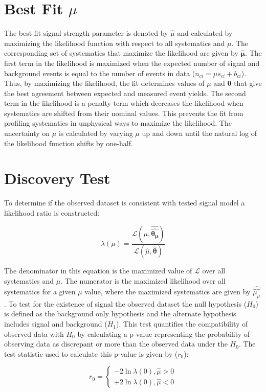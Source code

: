 \section{Best Fit $\mu$}
The best fit signal strength parameter is denoted by $\hat{\mu}$ and calculated by maximizing the likelihood function with respect to all systematics and $\mu$. The corresponding set of systematics that maximize the likelihood are given by $\bm{\hat{\mu}}$. The first term in the likelihood is maximized when the expected number of signal and background events is equal to the number of events in data ($n_{ci}=\mu s_{ci} + b_{ci}$). Thus, by maximizing the likelihood, the fit determines values of $\mu$ and $\bm{\theta}$ that give the best agreement between expected and measured event yields. The second term in the likelihood is a penalty term which decreases the likelihood when systematics are shifted from their nominal values. This prevents the fit from profiling systematics in unphysical ways to maximize the likelihood. The uncertainty on $\mu$ is calculated by varying $\mu$ up and down until the natural log of the likelihood function shifts by one-half.


\section{Discovery Test}
To determine if the observed dataset is consistent with tested signal model a likelihood ratio is constructed:

\begin{equation}
\lambda(\mu)=\frac{\mathcal{L}(\mu, \hat{\hat{\bm{\theta_{\mu}}}})}{\mathcal{L}(\hat{\mu}, \hat{\bm{\theta}})}
\end{equation}

The denominator in this equation is the maximized value of $\mathcal{L}$ over all systematics and $\mu$. The numerator is the maximized likelihood over all systematics for a given $\mu$ value, where the maximized systematics are given by $\hat{\hat{\mu_{\mu}}}$. To test for the existence of signal the observed dataset the null hypothesis ($H_{0}$) is defined as the background only hypothesis and the alternate hypothesis includes signal and background ($H_{1}$). This test quantifies the compatibility of observed data with $H_{0}$ by calculating a p-value representing the probability of observing data as discrepant or more than the observed data under the $H_{0}$. The test statistic used to calculate this p-value is given by ($r_{0}$):

\begin{equation}
r_{0}=\left\{ \begin{array}{ll}
-2\ln \lambda (0), \hat{\mu} > 0\\
+2\ln \lambda (0), \hat{\mu} < 0
\end{array}
\right.
\end{equation}

